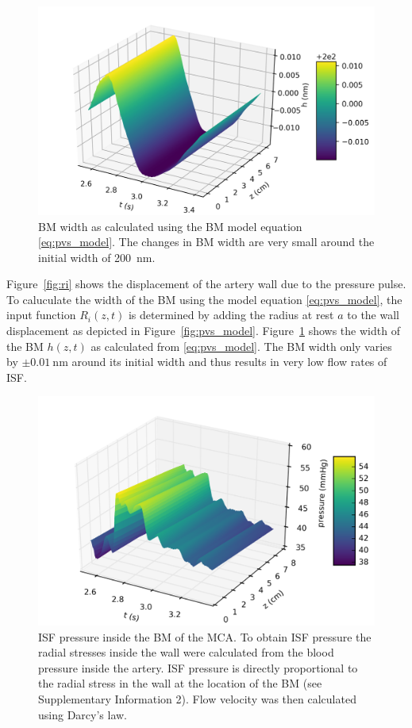 \documentclass[a4paper,titlepage]{scrartcl}
\begin{document}
\begin{figure}
\centerline{\includegraphics{figures/h.png}}
\caption{BM width as calculated using the BM model equation \eqref{eq:pvs_model}. The changes in BM width are very small around the initial width of \SI{200}{\nano\metre}.\label{fig:h}}
\end{figure}

Figure~\ref{fig:ri} shows the displacement of the artery wall due to the pressure pulse. To caluculate the width of the BM using the model equation \eqref{eq:pvs_model}, the input function $R_i(z,t)$ is determined by adding the radius at rest $a$ to the wall displacement as depicted in Figure~\ref{fig:pvs_model}. Figure~\ref{fig:h} shows the width of the BM $h(z,t)$ as calculated from \eqref{eq:pvs_model}. The BM width only varies by $\pm \SI{0.01}{\nano\metre}$ around its initial width and thus results in very low flow rates of ISF.

\begin{figure}
\centerline{\includegraphics{figures/bm_pressure.png}}
\caption{ISF pressure inside the BM of the MCA. To obtain ISF pressure the radial stresses inside the wall were calculated from the blood pressure inside the artery. ISF pressure is directly proportional to the radial stress in the wall at the location of the BM (see Supplementary Information 2). Flow velocity was then calculated using Darcy's law.\label{fig:bm_pressure}}
\end{figure}
\end{document}
